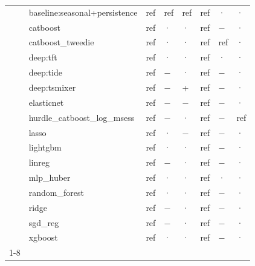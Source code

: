 \begin{table}
\begin{tabular}{llllllll}
 & baseline:seasonal+persistence & ref & ref & ref & ref & · & · \\
 & catboost & ref & · & · & ref & − & · \\
 & catboost\_tweedie & ref & · & · & ref & ref & · \\
 & deep:tft & ref & · & · & ref & · & · \\
 & deep:tide & ref & − & · & ref & − & · \\
 & deep:tsmixer & ref & − & + & ref & − & · \\
 & elasticnet & ref & − & − & ref & − & · \\
 & hurdle\_catboost\_log\_msess & ref & − & · & ref & − & ref \\
 & lasso & ref & · & − & ref & − & · \\
 & lightgbm & ref & · & · & ref & − & · \\
 & linreg & ref & − & · & ref & − & · \\
 & mlp\_huber & ref & · & · & ref & · & · \\
 & random\_forest & ref & · & · & ref & − & · \\
 & ridge & ref & − & · & ref & − & · \\
 & sgd\_reg & ref & − & · & ref & − & · \\
 & xgboost & ref & · & · & ref & − & · \\
\cline{1-8}
\bottomrule
\end{tabular}
\end{table}

